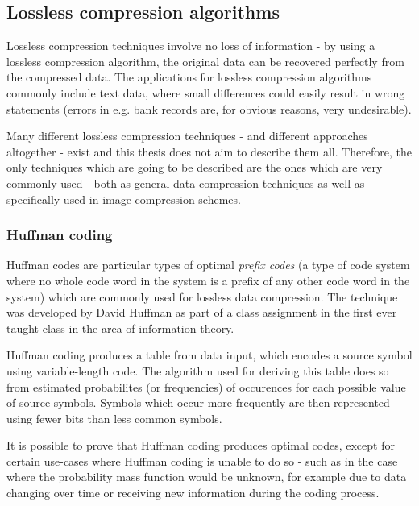 \documentclass[thesis=M,english]{FITthesis}[2012/10/20]
\begin{document}
\subsection{Lossless compression algorithms}
Lossless compression techniques involve no loss of information - by using
a lossless compression algorithm, the original data can be recovered perfectly from the
compressed data. The applications for lossless compression algorithms commonly include
text data, where small differences could easily result in wrong statements
(errors in e.g. bank records are, for obvious reasons, very undesirable).

Many different lossless compression techniques - and different approaches altogether -
exist and this thesis does not aim to describe them all. Therefore, the only techniques
which are going to be described are the ones which are very commonly used - both
as general data compression techniques as well as specifically used in image
compression schemes.

\subsubsection{Huffman coding}
Huffman codes are particular types of optimal \emph{prefix codes} (a type of
code system where no whole code word in the system is a prefix of any other
code word in the system) which are commonly used for lossless data compression.
The technique was developed by David Huffman as part of a class assignment in the
first ever taught class in the area of information theory.\cite{datacompression}

Huffman coding produces a table from data input, which encodes a source symbol using
variable-length code. The algorithm used for deriving this table does so from estimated
probabilites (or frequencies) of occurences for each possible value of source symbols.
Symbols which occur more frequently are then represented using fewer bits than less
common symbols.\cite{huffman}

It is possible to prove that Huffman coding produces optimal codes, except for
certain use-cases where Huffman coding is unable to do so - such as in the case
where the probability mass function would be unknown, for example due to data changing over
time or receiving new information during the coding process.
\end{document}
